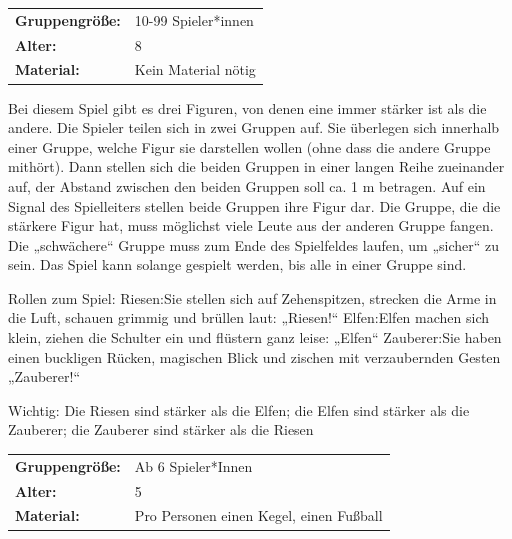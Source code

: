 \newpage

\begin{table}[H]
\begin{tabular}{>{\bfseries}lp{8cm}}
   Gruppengröße:   & 10-99 Spieler*innen\\
    Alter: & 8 \\
    Material: & Kein Material nötig \\
\end{tabular}
\end{table} 
 Bei diesem Spiel gibt es drei Figuren, von denen eine immer stärker ist als die andere. Die Spieler teilen sich in zwei Gruppen auf. Sie überlegen sich innerhalb einer Gruppe, welche Figur sie darstellen wollen (ohne dass die andere Gruppe mithört). Dann stellen sich die beiden Gruppen in einer langen Reihe zueinander auf, der Abstand zwischen den beiden Gruppen soll ca. 1 m betragen. Auf ein Signal des Spielleiters stellen beide Gruppen ihre Figur dar. Die Gruppe, die die stärkere Figur hat, muss möglichst viele Leute aus der anderen Gruppe fangen.  Die „schwächere“ Gruppe muss zum Ende des Spielfeldes laufen, um „sicher“ zu sein. Das Spiel kann solange gespielt werden, bis alle in einer Gruppe sind.\newline

Rollen zum Spiel: Riesen:Sie stellen sich auf Zehenspitzen, strecken die Arme in die Luft, schauen grimmig und brüllen laut: „Riesen!“ Elfen:Elfen machen sich klein, ziehen die Schulter ein und flüstern ganz leise:  „Elfen“ Zauberer:Sie haben einen buckligen Rücken, magischen Blick und zischen mit verzaubernden Gesten „Zauberer!“\newline

Wichtig: Die Riesen sind stärker als die Elfen; die Elfen sind stärker als die Zauberer; die Zauberer sind stärker als die Riesen \\




\begin{table}[H]
\begin{tabular}{>{\bfseries}lp{8cm}}
   Gruppengröße:   & Ab 6 Spieler*Innen\\
    Alter: & 5 \\
    Material: & Pro Personen einen Kegel, einen Fußball  \\
\end{tabular}
\end{table} 

